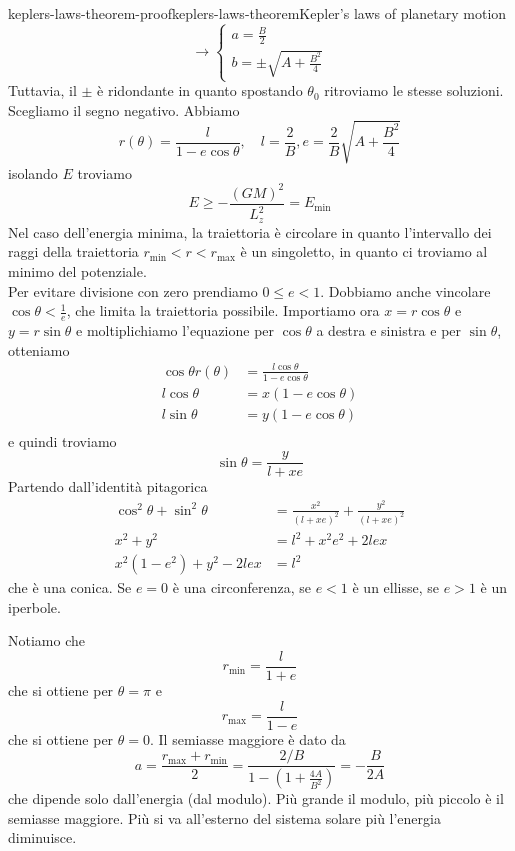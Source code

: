 \documentclass[preview]{standalone}
\begin{document}
\begin{snippetproof}{keplers-laws-theorem-proof}{keplers-laws-theorem}{Kepler's laws of planetary motion}
\[        \to \begin{cases}
            a = \frac{B}{2} \\
            b = \pm\sqrt{A + \frac{B^2}{4}}
        \end{cases}
    \]
    Tuttavia, il \(\pm\) è ridondante in quanto spostando \(\theta_0\)
    ritroviamo le stesse soluzioni. Scegliamo il segno negativo.
    Abbiamo
    \[
        r(\theta) = \frac{l}{1-e\cos\theta}, \quad l = \frac{2}{B}, e = \frac{2}{B} \sqrt{A + \frac{B^2}{4}}
    \]
    isolando \(E\) troviamo
    \[
        E \geq - \frac{{(GM)}^2}{L_z^2} = E_\text{min}
    \]
    Nel caso dell'energia minima, la traiettoria è circolare in quanto l'intervallo dei raggi
    della traiettoria \(r_\text{min} < r < r_\text{max}\) è un singoletto, in quanto ci troviamo al minimo del potenziale. \\
    Per evitare divisione con zero prendiamo \(0 \leq e < 1\).
    Dobbiamo anche vincolare \(\cos\theta < \frac{1}{e}\), che limita la traiettoria possibile.
    Importiamo ora \(x = r\cos\theta\) e \(y = r\sin\theta\) e moltiplichiamo l'equazione per \(\cos\theta\)
    a destra e sinistra e per \(\sin\theta\), otteniamo
    \begin{align*}
        \cos\theta r(\theta) &= \frac{l\cos\theta}{1-e\cos\theta} \\
        l\cos\theta &= x(1-e\cos\theta) \\
        l\sin\theta &= y(1-e\cos\theta) \\
    \end{align*}
    e quindi troviamo
    \[
        \sin\theta = \frac{y}{l+xe}
    \]
    Partendo dall'identità pitagorica
    \begin{align*}
        \cos^2\theta + \sin^2\theta &= \frac{x^2}{{(l+xe)}^2} + \frac{y^2}{{(l+xe)}^2} \\
        x^2 + y^2 &= l^2 +x^2e^2 + 2lex \\
        x^2{(1-e^2)} + y^2 - 2lex &= l^2
    \end{align*}
    che è una conica.
    Se \(e=0\) è una circonferenza,
    se \(e<1\) è un ellisse, se \(e>1\) è un iperbole. %

    Notiamo che
    \[
        r_\text{min} = \frac{l}{1+e}
    \]
    che si ottiene per \(\theta = \pi\) e 
    \[
        r_\text{max} = \frac{l}{1-e}
    \]
    che si ottiene per \(\theta = 0\).
    Il semiasse maggiore è dato da
    \[
        a = \frac{r_\text{max} + r_\text{min}}{2}
        = \frac{2/B}{1 - \left(1 + \frac{4A}{B^2}\right)}
        = -\frac{B}{2A}
    \]
    che dipende solo dall'energia (dal modulo).
    Più grande il modulo, più piccolo è il semiasse maggiore.
    Più si va all'esterno del sistema solare più l'energia diminuisce.


\end{snippetproof}
\end{document}

